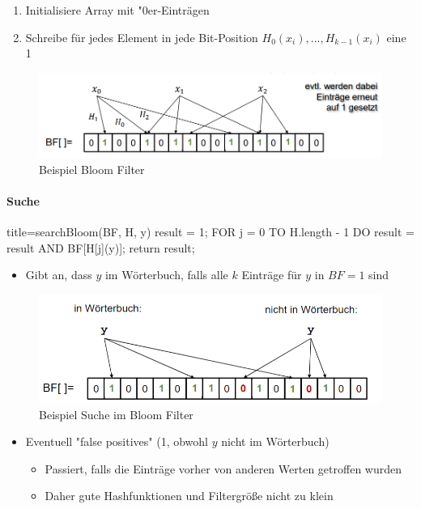 \documentclass[
    ngerman,
    color=3b,
    load_common, %
    summary,
    boxarc,
]{tuda_summary}
\begin{document}
\begin{enumerate}
    \item Initialisiere Array mit "$0$er-Einträgen
    \item Schreibe für jedes Element in jede Bit-Position $H_0(x_i),...,H_{k-1}(x_i)$ eine 1
\end{enumerate}
\begin{figure}[h]
    \centering
    \includegraphics[width=15cm]{pictures/bloomCreate.PNG}
    \caption{Beispiel Bloom Filter}
\end{figure}
\clearpage
\paragraph{Suche}\mbox{}
\begin{codeBlock}[autogobble]{title={searchBloom(BF, H, y)}}
result = 1;
FOR j = 0 TO H.length - 1 DO
    result = result AND BF[H[j](y)];
return result;
\end{codeBlock}
\begin{itemize}
    \item Gibt an, dass $y$ im Wörterbuch, falls alle $k$ Einträge für $y$ in $BF=1$ sind
\end{itemize}
\begin{figure}[h]
    \centering
    \includegraphics[width=13.5cm]{pictures/bloomSearch.PNG}
    \caption{Beispiel Suche im Bloom Filter}
\end{figure}
\begin{itemize}
    \item Eventuell \string"false positives\string" (1, obwohl $y$ nicht im Wörterbuch)
          \begin{itemize}
              \item Passiert, falls die Einträge vorher von anderen Werten getroffen wurden
              \item Daher gute Hashfunktionen und Filtergrö\ss e nicht zu klein
          \end{itemize}
\end{itemize}
\clearpage
\end{document}
